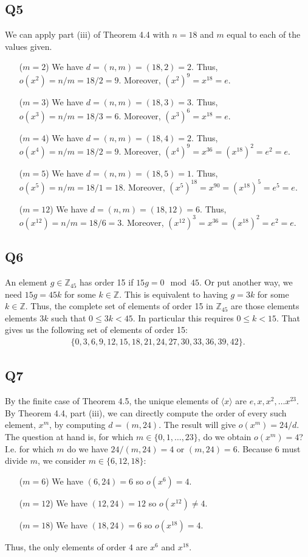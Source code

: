 \documentclass[12pt]{article}
\def\Z{{\mathbb Z}}        %
\numberwithin{theorem}{section}
\numberwithin{equation}{section}
\numberwithin{remark}{section}
\numberwithin{definition}{section}
\numberwithin{theorem}{section}
\numberwithin{lemma}{section}
\numberwithin{example}{section}
\begin{document}
\subsection{Q5}

We can apply part (iii) of Theorem 4.4 with $n=18$ and $m$ equal to each of the values given. 
\begin{itemize}
	\item[($m=2$)]{We have $d=(n,m)=(18,2)=2$. Thus, $o(x^2)=n/m=18/2=9$. Moreover, $(x^2)^9=x^{18}=e$.}
	\item[($m=3$)]{We have $d=(n,m)=(18,3)=3$. Thus, $o(x^3)=n/m=18/3=6$. Moreover, $(x^3)^6=x^{18}=e$.}
	\item[($m=4$)]{We have $d=(n,m)=(18,4)=2$. Thus, $o(x^4)=n/m=18/2=9$. Moreover, $(x^4)^9=x^{36}=(x^{18})^2=e^2=e$.}
	\item[($m=5$)]{We have $d=(n,m)=(18,5)=1$. Thus, $o(x^5)=n/m=18/1=18$. Moreover, $(x^5)^{18}=x^{90}=(x^{18})^5=e^5=e$.}
	\item[($m=12$)]{We have $d=(n,m)=(18,12)=6$. Thus, $o(x^{12})=n/m=18/6=3$. Moreover, $(x^{12})^3=x^{36}=(x^{18})^2=e^2=e$.}
\end{itemize}



\subsection{Q6}

An element $g\in\Z_{45}$ has order 15 if $15g=0\mod{45}$. Or put another way, we need $15g=45k$ for some $k\in\Z$. This is equivalent to having $g=3k$ for some $k\in\Z$. Thus, the complete set of elements of order 15 in $\Z_{45}$ are those elements elements $3k$ such that $0\le 3k < 45$. In particular this requires $0\le k < 15$. That gives us the following set of elements of order 15:
\begin{align*}
	\{0,3,6,9,12,15,18,21,24,27,30,33,36,39,42\}.
\end{align*}



\subsection{Q7}

By the finite case of Theorem 4.5, the unique elements of $\langle x \rangle$ are $e,x,x^2,\ldots x^{23}$. By Theorem 4.4, part (iii), we can directly compute the order of every such element, $x^m$, by computing $d=(m,24)$. The result will give $o(x^m)=24/d$. The question at hand is, for which $m\in\{0,1,\ldots,23\}$, do we obtain $o(x^m)=4$? I.e. for which $m$ do we have $24/(m,24)=4$ or $(m,24)=6$. Because $6$ must divide $m$, we consider $m\in\{6,12,18\}$:
\begin{itemize}
	\item[($m=6$)]{We have $(6,24)=6$ so $o(x^6)=4$.}
	\item[($m=12$)]{We have $(12,24)=12$ so $o(x^{12})\neq4$.}
	\item[($m=18$)]{We have $(18,24)=6$ so $o(x^{18})=4$.}
\end{itemize}
Thus, the only elements of order $4$ are $x^6$ and $x^{18}$.
\end{document}
